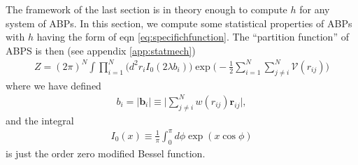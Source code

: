 \documentclass[twocolumn,amsmath,amssymb,aps]{revtex4-1}%
\begin{document}
The framework of the last section is in theory enough to compute $h$ for any
system of ABPs. In this section, we compute some statistical properties of
ABPs with $h$ having the form of eqn \ref{eq:specifichfunction}.
The ``partition function'' of ABPS is then (see appendix \ref{app:statmech})
\begin{align}\label{eq:partition}
  Z =(2\pi)^N\int\prod_{i=1}^N\big(d^2r_iI_0(2\lambda b_i))
  \exp\bigg(-\frac{1}{2}\sum_{i=1}^N\sum_{j\neq i}^N
  \mathcal{V}(r_{ij})\bigg)
\end{align}
where we have defined
\begin{align}\label{eq:b_i}
  b_i = |\bm{b}_i|\equiv\bigg|\sum_{j\neq i}^Nw(r_{ij})
  \bm{r}_{ij}\bigg|,
\end{align}
and the integral
\begin{align}\label{eq:Iintegral}
  I_0(x)\equiv\frac{1}{\pi}\int_0^{\pi}d\phi\exp(x\cos\phi)
\end{align}
is just the order zero modified Bessel function.
\end{document}
